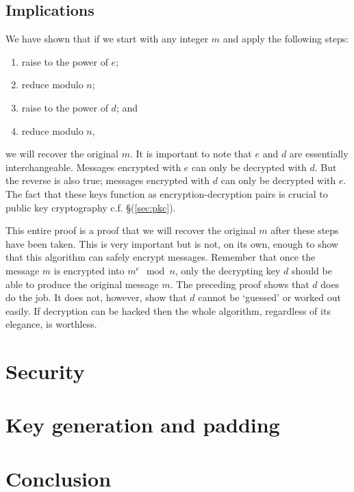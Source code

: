 \documentclass[]{scrartcl}
\theoremstyle{definition}
\renewcommand{\sec}[1]{\S \ref{#1}}
\let\oldref\ref
\renewcommand{\ref}[1]{(\oldref{#1})}
\begin{document}
\subsection{Implications}
We have shown that if we start with any integer $m$ and apply the following steps:
\begin{enumerate}
    \item raise to the power of $e$;
    \item reduce modulo $n$;
    \item raise to the power of $d$; and
    \item reduce modulo $n$,
\end{enumerate}
we will recover the original $m$. It is important to note that $e$ and $d$ are essentially interchangeable. Messages encrypted with $e$ can only be decrypted with $d$. But the reverse is also true; messages encrypted with $d$ can only be decrypted with $e$. The fact that these keys function as encryption-decryption pairs is crucial to public key cryptography c.f. \sec{sec:pkc}.

This entire proof is a proof that we will recover the original $m$ after these steps have been taken. This is very important but is not, on its own, enough to show that this algorithm can safely encrypt messages. Remember that once the message $m$ is encrypted into $m^e \mod n$, only the decrypting key $d$ should be able to produce the original message $m$. The preceding proof shows that $d$ does do the job. It does not, however, show that $d$ cannot be `guessed' or worked out easily. If decryption can be hacked then the whole algorithm, regardless of its elegance, is worthless.

\section{Security}

\section{Key generation and padding}\label{sec:gen-pad}

\section{Conclusion}
\end{document}
